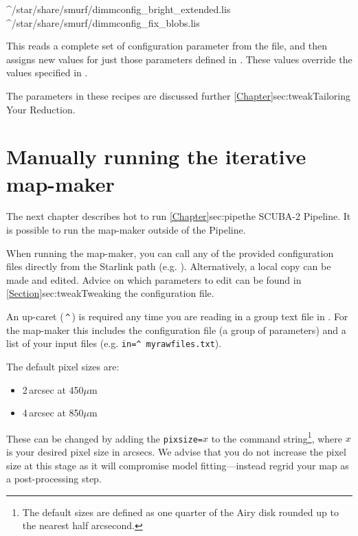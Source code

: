 \begin{terminalv}
^/star/share/smurf/dimmconfig_bright_extended.lis
^/star/share/smurf/dimmconfig_fix_blobs.lis
\end{terminalv}

This reads a complete set of configuration parameter from the
 file, and then assigns new values for just
those parameters defined in . These values override
the values specified in .

The parameters in these recipes are discussed further
\cref{Chapter}{sec:tweak}{Tailoring Your Reduction}.




\section{Manually running the iterative map-maker}
\label{sec:running}

The next chapter describes hot to run \cref{Chapter}{sec:pipe}{the SCUBA-2 Pipeline}.
It is possible to run the map-maker outside of the Pipeline.

When running the map-maker, you can call any of the provided
configuration files directly from the Starlink path (e.g.
). Alternatively,
a local copy can be made and edited. Advice on which parameters to
edit can be found in \cref{Section}{sec:tweak}{Tweaking the
configuration file}.

\begin{tip}
  An up-caret (\,\texttt{\^{}}\,) is required any time you are reading
  in a group text file in \starlink. For the map-maker this includes
  the configuration file (a group of parameters) and a list of your
  input files (e.g. \texttt{in=\^{}\,myrawfiles.txt}).
\end{tip}


The default pixel sizes are:
\begin{itemize}
\item 2\,arcsec at 450$\mu$m
\item 4\,arcsec at 850$\mu$m
\end{itemize}

These can be changed by adding the \texttt{pixsize=}$x$ to the
command string\footnote{The default sizes are defined as one quarter
of the Airy disk rounded up to the nearest half arcsecond.}, where $x$
is your desired pixel size in arcsecs. We advise that you do not
increase the pixel size at this stage as it will compromise model
fitting---instead regrid your map as a post-processing step.

